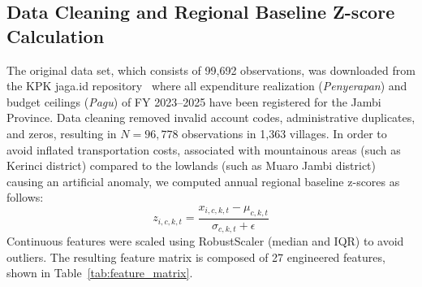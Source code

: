 \documentclass[conference]{IEEEtran}
\begin{document}
\subsection{Data Cleaning and Regional Baseline Z-score Calculation}

The original data set, which consists of 99,692 observations, was downloaded from the KPK jaga.id repository~\cite{ref26} where all expenditure realization (\textit{Penyerapan}) and budget ceilings (\textit{Pagu}) of FY 2023--2025 have been registered for the Jambi Province. Data cleaning removed invalid account codes, administrative duplicates, and zeros, resulting in $N = 96,778$ observations in 1,363 villages. In order to avoid inflated transportation costs, associated with mountainous areas (such as Kerinci district) compared to the lowlands (such as Muaro Jambi district) causing an artificial anomaly, we computed annual regional baseline z-scores as follows:
\begin{equation}
z_{i,c,k,t} = \frac{x_{i,c,k,t} - \mu_{c,k,t}}{\sigma_{c,k,t} + \epsilon}
\end{equation}
Continuous features were scaled using RobustScaler (median and IQR) to avoid outliers. The resulting feature matrix is composed of 27 engineered features, shown in Table~\ref{tab:feature_matrix}.

\begin{table}[htbp]
\centering
\caption{Engineered Feature Constructs and Targeted Anomaly Typologies}
\label{tab:feature_matrix}
\setlength{\tabcolsep}{2.5pt}
\renewcommand{\arraystretch}{0.94}
\end{table}
\end{document}
